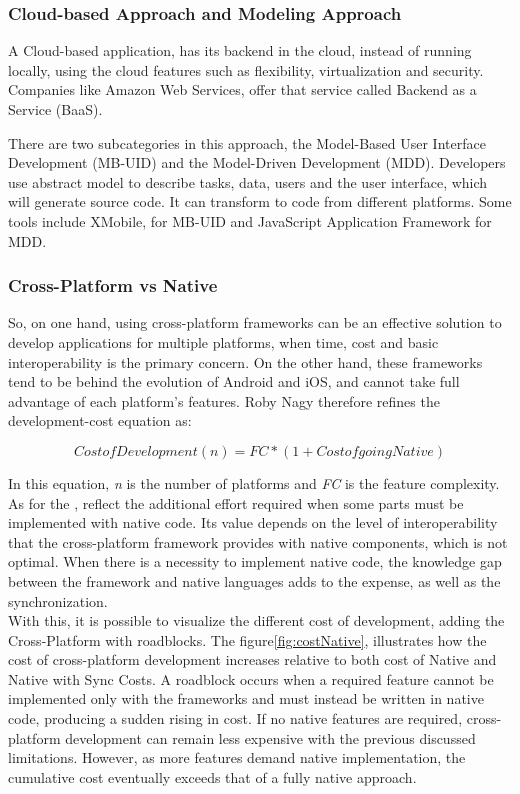 \subsubsection{Cloud-based Approach and Modeling Approach}

A Cloud-based application, has its backend in the cloud, instead of running locally, using the cloud features such as flexibility, virtualization and security.\cite{ELKASSAS2017163}
Companies like Amazon Web Services, offer that service called Backend as a Service (BaaS).\cite{Khachouch2020}

There are two subcategories in this approach, the Model-Based User Interface Development (MB-UID) and the Model-Driven Development (MDD).
Developers use abstract model to describe tasks, data, users and the user interface, which will generate source code.
It can transform to code from different platforms.
Some tools include XMobile, for MB-UID and JavaScript Application Framework for MDD\@.

\subsubsection{Cross-Platform vs Native}

So, on one hand, using cross-platform frameworks can be an effective solution to develop applications for multiple platforms, when time, cost and basic interoperability is the primary concern.
On the other hand, these frameworks tend to be behind the evolution of Android and iOS, and cannot take full advantage of each platform's features.
Roby Nagy therefore refines the development-cost equation as:

\[Cost of Development (n) = FC * (1 + Cost of going Native)\]

In this equation, \textit{n} is the number of platforms and \textit{FC} is the feature complexity.
As for the , reflect the additional effort required when some parts must be implemented with native code.
Its value depends on the level of interoperability that the cross-platform framework provides with native components, which is not optimal.
When there is a necessity to implement native code, the knowledge gap between the framework and native languages adds to the expense, as well as the synchronization.\cite{Nagy2022}\\

With this, it is possible to visualize the different cost of development, adding the Cross-Platform with roadblocks.
The figure\ref{fig:costNative}, illustrates how the cost of cross-platform development increases relative to both cost of Native and Native with Sync Costs.
A roadblock occurs when a required feature cannot be implemented only with the frameworks and must instead be written in native code, producing a sudden rising in cost.
If no native features are required, cross-platform development can remain less expensive with the previous discussed limitations.
However, as more features demand native implementation, the cumulative cost eventually exceeds that of a fully native approach.\cite{Nagy2022}

